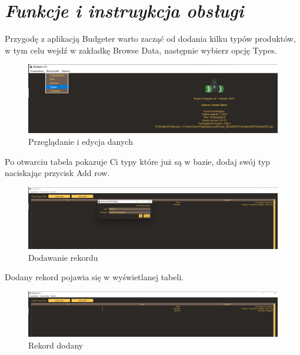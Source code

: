 \documentclass[a4paper,10pt, twoside]{report}
\newcommand{\customstylesection}[1]{\textbf{\textit{#1}}}
\begin{document}
\section{\customstylesection{Funkcje i instruykcja obsługi}}
{Przygodę z aplikacją Budgeter warto zacząć od dodania kilku typów produktów, 
w tym celu wejdź w zakładkę Browse Data, następnie wybierz opcję Types.}

\begin{figure}[H]           %
    \caption{Przeglądanie i edycja danych}
    \label{fig:Przeglądanie i edycja danych}
    \centering
    \includegraphics[width=12cm]{figures/Guide/Budgeter_Instruction_04_browse_p1.png}
\end{figure}

{Po otwarciu tabela pokazuje Ci typy które już są w bazie, dodaj swój typ 
naciskając przycisk Add row.}

\begin{figure}[H]           %
    \caption{Dodawanie rekordu}
    \label{fig:Dodawanie rekordu}
    \centering
    \includegraphics[width=12cm]{figures/Guide/Budgeter_Instruction_04_browse_p2_add_data.png}
\end{figure}

{Dodany rekord pojawia się w wyświetlanej tabeli.}

\begin{figure}[H]           %
    \caption{Rekord dodany}
    \label{fig:Rekord dodany}
    \centering
    \includegraphics[width=12cm]{figures/Guide/Budgeter_Instruction_04_browse_p3_add_data_success.png}
\end{figure}
\end{document}
